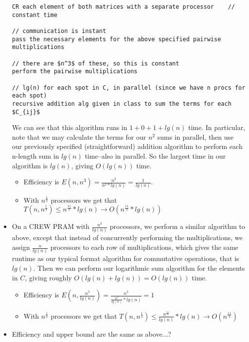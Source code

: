 \documentclass{article}
\begin{document}
\begin{itemize}
\begin{lstlisting}
CR each element of both matrices with a separate processor    // constant time

// communication is instant
pass the necessary elements for the above specified pairwise multiplications

// there are $n^3$ of these, so this is constant
perform the pairwise multiplications

// lg(n) for each spot in C, in parallel (since we have n procs for each spot)
recursive addition alg given in class to sum the terms for each $C_{ij}$
      \end{lstlisting}

We can see that this algorithm runs in $1+0+1+ lg(n)$ time. In particular, note that we may calculate the terms for our $n^2$ sums in parallel, then use our previously specified (straightforward) addition algorithm to perform each n-length sum in $lg(n)$ time--also in parallel. So the largest time in our algorithm is $lg(n)$, giving $O(lg(n))$ time.
\begin{itemize}
  \item Efficiency is $E(n,n^3) = \frac{n^3}{n^3 * lg(n)} = \frac{1}{lg(n)}$.
  \item With $n^{\frac{1}{4}}$ processors we get that $T(n,n^{\frac{1}{4}}) \leq n^{\frac{11}{4}}*lg(n) \rightarrow O(n^{\frac{11}{4}}*lg(n))$
\end{itemize}

\item On a CREW PRAM with $\frac{n^3}{lg(n)}$ processors, we perform a similar algorithm to above, except that instead of concurrently performing the multiplications, we assign $\frac{n}{lg(n)}$ processors to each row of multiplications, which gives the same runtime as our typical format algorithm for commutative operations, that is $lg(n)$. Then we can perform our logarithmic sum algorithm for the elements in $C$, giving roughly $O(lg(n) + lg(n)) = O(lg(n))$ time.
\begin{itemize}
  \item Efficiency is $E(n,\frac{n^3}{lg(n)}) = \frac{n^3}{\frac{n^3}{lg(n)}*lg(n)} = 1$
  \item With $n^{\frac{1}{4}}$ processors we get that $T(n,n^{\frac{1}{4}}) \leq \frac{n^{\frac{11}{4}}}{lg(n)}*lg(n) \rightarrow O(n^{\frac{11}{4}})$
\end{itemize}

\item Efficiency and upper bound are the same as above...?
\end{itemize}
\end{document}
